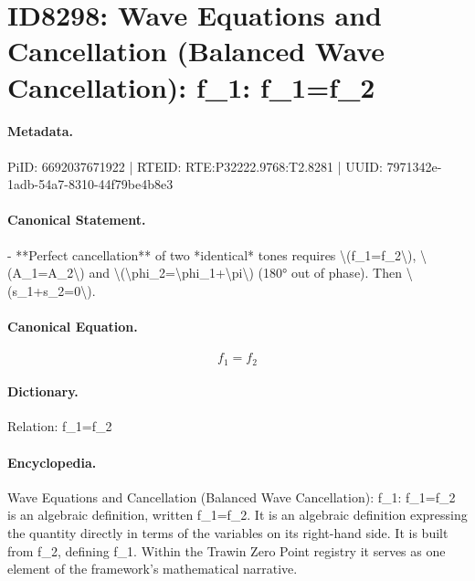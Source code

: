 \section*{ID8298: Wave Equations and Cancellation (Balanced Wave Cancellation): f\_1: f\_1=f\_2}
\paragraph{Metadata.}
PiID: 6692037671922 | RTEID: RTE:P32222.9768:T2.8281 | UUID: 7971342e-1adb-54a7-8310-44f79be4b8e3

\paragraph{Canonical Statement.}
- **Perfect cancellation** of two *identical* tones requires \textbackslash{}(f\_1=f\_2\textbackslash{}), \textbackslash{}(A\_1=A\_2\textbackslash{}) and \textbackslash{}(\textbackslash{}phi\_2=\textbackslash{}phi\_1+\textbackslash{}pi\textbackslash{}) (180° out of phase). Then \textbackslash{}(s\_1+s\_2=0\textbackslash{}).

\paragraph{Canonical Equation.}
\[
f_1=f_2
\]

\paragraph{Dictionary.}
Relation: f\_1=f\_2

\paragraph{Encyclopedia.}
Wave Equations and Cancellation (Balanced Wave Cancellation): f\_1: f\_1=f\_2 is an algebraic definition, written f\_1=f\_2. It is an algebraic definition expressing the quantity directly in terms of the variables on its right-hand side. It is built from f\_2, defining f\_1. Within the Trawin Zero Point registry it serves as one element of the framework's mathematical narrative.
